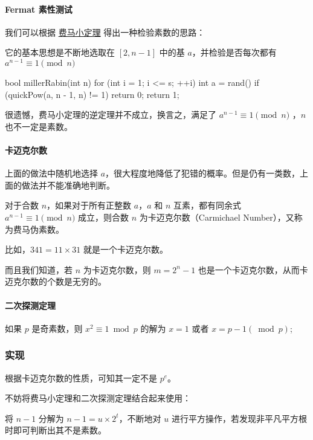\paragraph{Fermat 素性测试}

我们可以根据 \href{/math/fermat/#_1}{费马小定理} 得出一种检验素数的思路：

它的基本思想是不断地选取在 $[2, n-1]$ 中的基 $a$，并检验是否每次都有 $a^{n-1} \equiv 1 \pmod n$

\begin{cppcode}
bool millerRabin(int n) {
  for (int i = 1; i <= s; ++i) {
    int a = rand() %
    if (quickPow(a, n - 1, n) != 1) return 0;
  }
  return 1;
}
\end{cppcode}

很遗憾，费马小定理的逆定理并不成立，换言之，满足了 $a^{n-1} \equiv 1 \pmod n$ ，$n$ 也不一定是素数。

\paragraph{卡迈克尔数}

上面的做法中随机地选择 $a$，很大程度地降低了犯错的概率。但是仍有一类数，上面的做法并不能准确地判断。

对于合数 $n$，如果对于所有正整数 $a$，$a$ 和 $n$ 互素，都有同余式 $a^{n-1} \equiv 1 \pmod n$ 成立，则合数 $n$ 为卡迈克尔数（Carmichael Number），又称为费马伪素数。

比如，$341 = 11 \times 31$ 就是一个卡迈克尔数。

而且我们知道，若 $n$ 为卡迈克尔数，则 $m=2^{n}-1$ 也是一个卡迈克尔数，从而卡迈克尔数的个数是无穷的。

\paragraph{二次探测定理}

如果 $p$ 是奇素数，则 $x^2 \equiv 1 \bmod p$ 的解为 $x = 1$ 或者 $x = p - 1 (\bmod p)$;

\subsubsection{实现}

根据卡迈克尔数的性质，可知其一定不是 $p^e$。

不妨将费马小定理和二次探测定理结合起来使用：

将 $n−1$ 分解为 $n−1=u \times 2^t$，不断地对 $u$ 进行平方操作，若发现非平凡平方根时即可判断出其不是素数。

